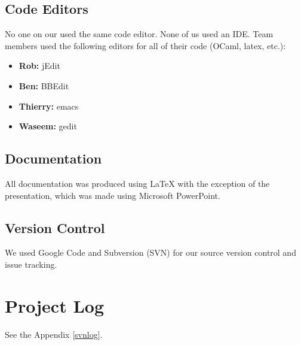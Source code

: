 \subsection{Code Editors}

No one on our used the same code editor.  None of us used an IDE.  Team members used the following editors for all of their code (OCaml, latex, etc.):

\begin{itemize}
\item \textbf{Rob:} jEdit
\item \textbf{Ben:} BBEdit
\item \textbf{Thierry:} emacs
\item \textbf{Waseem:} gedit
\end{itemize}

\subsection{Documentation}
All documentation was produced using LaTeX with the exception of the presentation, which was made using Microsoft PowerPoint.

\subsection{Version Control}
We used Google Code and Subversion (SVN) for our source version control and issue tracking.

\section{Project Log}

See the Appendix \ref{svnlog}. 

